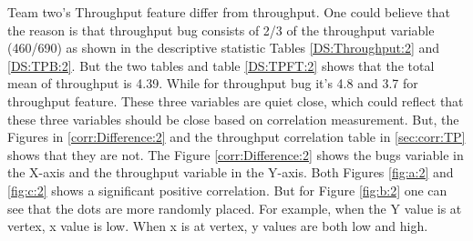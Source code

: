 \documentclass[UKenglish]{ifimaster}  %
\begin{document}
Team two's Throughput feature differ from throughput. One could believe that the reason is that throughput bug consists of 2/3 of the throughput variable (460/690) as shown in the descriptive statistic Tables \ref{DS:Throughput:2} and \ref{DS:TPB:2}. But the two tables and table \ref{DS:TPFT:2} shows that the total mean of throughput is 4.39. While for throughput bug it's 4.8 and 3.7 for throughput feature. These three variables are quiet close, which could reflect that these three variables should be close based on correlation measurement. But, the Figures in \ref{corr:Difference:2} and the throughput correlation table in \ref{sec:corr:TP} shows that they are not. The Figure \ref{corr:Difference:2} shows the bugs variable in the X-axis and the throughput variable in the Y-axis. Both Figures \ref{fig:a:2} and \ref{fig:c:2} shows a significant positive correlation. But for Figure \ref{fig:b:2} one can see that the dots are more randomly placed. For example, when the Y value is at vertex, x value is low.  When x is at vertex, y values are both low and high.  
\end{document}
